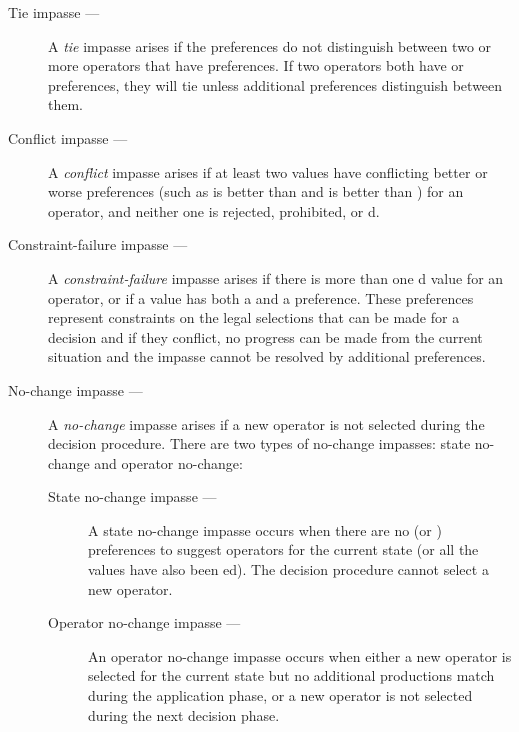 \begin{description}
\item[Tie impasse ---] 
	A \emph{tie} impasse arises if the preferences do not distinguish between two or more operators that have  preferences. If two operators both have  or  preferences, they will tie unless additional preferences distinguish between them.
	\vspace{-8pt}
\item[Conflict impasse ---]
	A \emph{conflict} impasse arises if at least two values have conflicting better or worse preferences (such as  is better than  and  is better than ) for an operator, and neither one is rejected, prohibited, or d.
	\vspace{-8pt}
\item[Constraint-failure impasse ---]
	A \emph{constraint-failure} impasse arises if there is more than one d value for an operator, or if a value has both a  and a  preference. These preferences represent constraints on the legal selections that can be made for a decision and if they conflict, no progress can be made from the current situation and the impasse cannot be resolved by additional preferences.
	\vspace{-8pt}
\item[No-change impasse ---]
	A \emph{no-change} impasse arises if a new operator is not selected during the decision procedure. There are two types of no-change impasses: state no-change and operator no-change:
	\vspace{-8pt} 
	\begin{description}
		\item[State no-change impasse ---] 
			A state no-change impasse occurs when there are no  (or ) preferences to suggest operators for the current state (or all the  values have also been ed). The decision procedure cannot select a new operator.\vspace{-8pt}
        \item[Operator no-change impasse ---] 
	        An operator no-change impasse occurs when either a new operator is selected for the current state but no additional productions match during the application phase, or a new operator is not selected during the next decision phase.
	\end{description}
\end{description}

